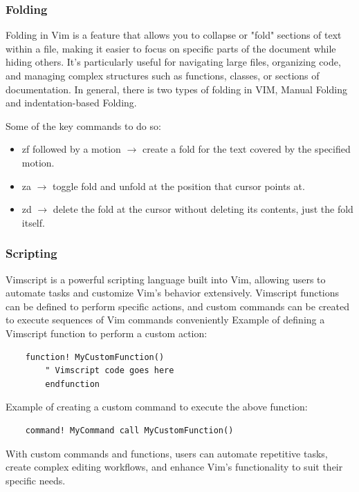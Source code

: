 \documentclass{article}
\begin{document}
	\subsubsection{Folding}
	Folding in Vim is a feature that allows you to collapse or "fold" sections of text within a file, making it easier to focus on specific parts of the document while hiding others.
	It's particularly useful for navigating large files, organizing code, and managing complex structures such as functions, classes, or sections of documentation.
	In general, there is two types of folding in VIM, Manual Folding and indentation-based Folding.

	Some of the key commands to do so:
	\begin{itemize}
		\item zf followed by a motion $\rightarrow$ create a fold for the text covered by the specified motion.
		\item za $\rightarrow$ toggle fold and unfold at the position that cursor points at.
		\item zd $\rightarrow$ delete the fold at the cursor without deleting its contents, just the fold itself.
	\end{itemize}

	\subsubsection{Scripting}
	Vimscript is a powerful scripting language built into Vim, allowing users to automate tasks and customize Vim's behavior extensively.
	Vimscript functions can be defined to perform specific actions, and custom commands can be created to execute sequences of Vim commands conveniently
	Example of defining a Vimscript function to perform a custom action:

	\begin{lstlisting}
	function! MyCustomFunction()
    	" Vimscript code goes here
		endfunction
	\end{lstlisting}

	Example of creating a custom command to execute the above function:

	\begin{lstlisting}
	command! MyCommand call MyCustomFunction()
	\end{lstlisting}


	With custom commands and functions, users can automate repetitive tasks, create complex editing workflows, and enhance Vim's functionality to suit their specific needs.
\end{document}
